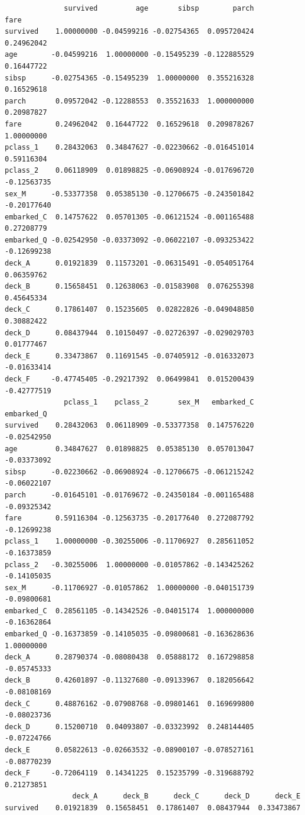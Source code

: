 \documentclass[
  letterpaper,
  DIV=11,
  numbers=noendperiod]{scrartcl}
\begin{document}
\begin{verbatim}
              survived         age       sibsp        parch        fare
survived    1.00000000 -0.04599216 -0.02754365  0.095720424  0.24962042
age        -0.04599216  1.00000000 -0.15495239 -0.122885529  0.16447722
sibsp      -0.02754365 -0.15495239  1.00000000  0.355216328  0.16529618
parch       0.09572042 -0.12288553  0.35521633  1.000000000  0.20987827
fare        0.24962042  0.16447722  0.16529618  0.209878267  1.00000000
pclass_1    0.28432063  0.34847627 -0.02230662 -0.016451014  0.59116304
pclass_2    0.06118909  0.01898825 -0.06908924 -0.017696720 -0.12563735
sex_M      -0.53377358  0.05385130 -0.12706675 -0.243501842 -0.20177640
embarked_C  0.14757622  0.05701305 -0.06121524 -0.001165488  0.27208779
embarked_Q -0.02542950 -0.03373092 -0.06022107 -0.093253422 -0.12699238
deck_A      0.01921839  0.11573201 -0.06315491 -0.054051764  0.06359762
deck_B      0.15658451  0.12638063 -0.01583908  0.076255398  0.45645334
deck_C      0.17861407  0.15235605  0.02822826 -0.049048850  0.30882422
deck_D      0.08437944  0.10150497 -0.02726397 -0.029029703  0.01777467
deck_E      0.33473867  0.11691545 -0.07405912 -0.016332073 -0.01633414
deck_F     -0.47745405 -0.29217392  0.06499841  0.015200439 -0.42777519
              pclass_1    pclass_2       sex_M   embarked_C  embarked_Q
survived    0.28432063  0.06118909 -0.53377358  0.147576220 -0.02542950
age         0.34847627  0.01898825  0.05385130  0.057013047 -0.03373092
sibsp      -0.02230662 -0.06908924 -0.12706675 -0.061215242 -0.06022107
parch      -0.01645101 -0.01769672 -0.24350184 -0.001165488 -0.09325342
fare        0.59116304 -0.12563735 -0.20177640  0.272087792 -0.12699238
pclass_1    1.00000000 -0.30255006 -0.11706927  0.285611052 -0.16373859
pclass_2   -0.30255006  1.00000000 -0.01057862 -0.143425262 -0.14105035
sex_M      -0.11706927 -0.01057862  1.00000000 -0.040151739 -0.09800681
embarked_C  0.28561105 -0.14342526 -0.04015174  1.000000000 -0.16362864
embarked_Q -0.16373859 -0.14105035 -0.09800681 -0.163628636  1.00000000
deck_A      0.28790374 -0.08080438  0.05888172  0.167298858 -0.05745333
deck_B      0.42601897 -0.11327680 -0.09133967  0.182056642 -0.08108169
deck_C      0.48876162 -0.07908768 -0.09801461  0.169699800 -0.08023736
deck_D      0.15200710  0.04093807 -0.03323992  0.248144405 -0.07224766
deck_E      0.05822613 -0.02663532 -0.08900107 -0.078527161 -0.08770239
deck_F     -0.72064119  0.14341225  0.15235799 -0.319688792  0.21273851
                deck_A      deck_B      deck_C      deck_D      deck_E
survived    0.01921839  0.15658451  0.17861407  0.08437944  0.33473867

\end{verbatim}
\end{document}
